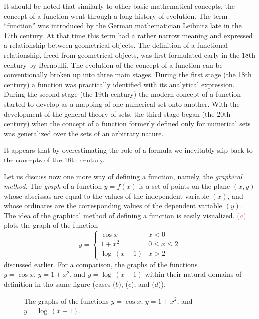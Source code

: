 {It should be noted that similarly to other basic mathematical concepts, the concept of a function went through a long history of evolution. The term ``function'' was introduced by the German mathematician Leibnitz late in the 17th century. At that time this term had a rather narrow meaning and expressed a relationship between geometrical objects. The definition of a functional relationship, freed from geometrical objects, was first formulated early in the 18th century by Bernoulli. The evolution of the concept of a function can be conventionally broken up into three main stages. During the first stage (the 18th century) a function was practically identified with its analytical expression. During the second stage (the 19th century) the modern concept of a function started to develop as a mapping of one numerical set onto another. With the development of the general theory of sets, the third stage began (the 20th century) when the concept of a function formerly defined only for numerical sets was generalized over the sets of an arbitrary nature.

\rdr It appears that by overestimating the role of a formula we inevitably slip back to the concepts of the 18th century.

\athr Let us discuss now one more way of defining a function, namely, the \emph{graphical method}. The \emph{graph} of a function $y = f(x)$ is a set of points on the plane $(x, y)$ whose abscissas are equal to the values of the independent variable $(x)$, and whose ordinates are the corresponding values of the dependent variable $(y)$. The idea of the graphical method of defining a function is easily visualized. \textcolor{IndianRed}{($a$)} plots the graph of the function
\begin{equation*}%
y = 
\begin{cases}
\cos x &  x < 0 \\
1 + x^{2} & 0 \leqslant x \leqslant 2 \\
\log \, (x - 1) & x > 2 
\end{cases}
\end{equation*}
discussed earlier. For a comparison, the graphs of the functions $y = \cos x, \, y = 1 +x^{2}$, and $y = \log \, (x -1)$ within their natural domains of definition in tho same figure (cases ($b$), ($c$), and ($d$)).
\begin{figure}[!h]
\centering



\caption{The graphs of the functions $y = \cos x, \, y = 1 +x^{2}$, and $y = \log \, (x -1)$.}
\label{fig-14}
\end{figure}

}
